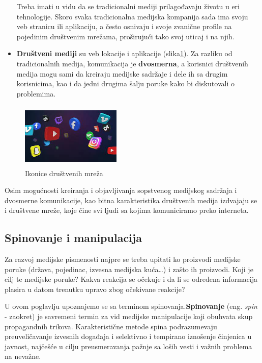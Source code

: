 \documentclass[a4paper]{article}
\begin{document}
\begin{itemize}
Treba imati u vidu da se tradicionalni mediji prilagođavaju životu u eri tehnologije. Skoro svaka tradicionalna medijska kompanija sada ima svoju veb stranicu ili aplikaciju, a često osnivaju i svoje zvanične profile na pojedinim društvenim mrežama, proširujući tako svoj uticaj i na njih.
	
	\item \textbf{Društveni mediji} su veb lokacije i aplikacije (slika\ref{fig:icons}). Za
	razliku od tradicionalnih medija, komunikacija je \textbf{dvosmerna}, a korisnici
	društvenih medija mogu sami da kreiraju medijske sadržaje i dele ih sa
	drugim korisnicima, kao i da jedni drugima šalju poruke kako bi
	diskutovali o problemima.
 \end{itemize}
	
	\begin{figure}[h!]
	\begin{center}
		\includegraphics[width=1.87842in,height=1.225in]{slika4.jpg}
	\end{center}
	\caption {Ikonice društvenih mreža}
	\label{fig:icons}
	
\end{figure}
	
	Osim mogućnosti kreiranja i objavljivanja sopstvenog medijskog sadržaja i dvosmerne komunikacije, kao bitna karakteristika društvenih medija izdvajaju se i društvene mreže, koje čine svi ljudi sa kojima komuniciramo preko interneta. 

\subsection{Spinovanje i manipulacija}
\label{sec:naslovN}

Za razvoj medijske pismenosti najpre se treba upitati ko proizvodi medijske poruke (država, pojedinac, izvesna medijska kuća…) i zašto ih proizvodi. Koji je cilj te medijske poruke? Kakva reakcija se očekuje i da li se određena informacija plasira u datom trenutku upravo zbog očekivane reakcije? 

U ovom poglavlju upoznajemo se sa terminom spinovanja.\textbf{Spinovanje} (eng. \emph{spin} - zaokret) je savremeni termin za vid medijske manipulacije koji obuhvata skup propagandnih trikova. Karakteristične metode spina podrazumevaju preuveličavanje izvesnih događaja i selektivno i tempirano iznošenje činjenica u javnost, najčešće u cilju preusmeravanja pažnje sa loših vesti i važnih problema na nevažne.
\end{document}
